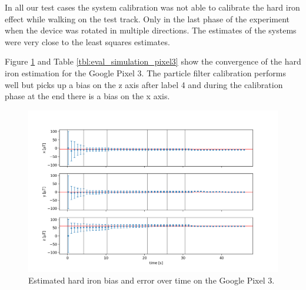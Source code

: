 In all our test cases the system calibration was not able to calibrate the hard iron effect while walking on the test track. Only in the last phase of the experiment when the device was rotated in multiple directions. The estimates of the systems were very close to the least squares estimates.

Figure \ref{fig:eval_simulation_pixel3} and Table \ref{tbl:eval_simulation_pixel3} show the convergence of the hard iron estimation for the Google Pixel 3. The particle filter calibration performs well but picks up a bias on the z axis after label 4 and during the calibration phase at the end there is a bias on the x axis.

\begin{figure}[H]
    \centering
    \includegraphics[width=1.0\textwidth]{figures/convergence_pixel3.png}
    \caption{Estimated hard iron bias and error over time on the Google Pixel 3.}
    \label{fig:eval_simulation_pixel3}
\end{figure}

